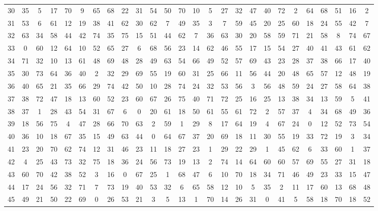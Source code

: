\begin{table}
\begin{tabular}{c c c c c c c c c c c c c c c c c c c c c c c c c c }
30 & 35 & 5 & 17 & 70 & 9 & 65 & 68 & 22 & 31 & 54 & 50 & 70 & 10 & 5 & 27 & 32 & 47 & 40 & 72 & 2 & 64 & 68 & 51 & 16 & 2 \\
31 & 53 & 6 & 61 & 12 & 19 & 38 & 41 & 62 & 30 & 62 & 7 & 49 & 35 & 3 & 7 & 59 & 45 & 20 & 25 & 60 & 18 & 24 & 55 & 42 & 7 \\
32 & 63 & 34 & 58 & 44 & 42 & 74 & 35 & 75 & 15 & 51 & 44 & 62 & 7 & 36 & 63 & 30 & 20 & 58 & 59 & 71 & 21 & 58 & 8 & 74 & 67 \\
33 & 0 & 60 & 12 & 64 & 10 & 52 & 65 & 27 & 6 & 68 & 56 & 23 & 14 & 62 & 46 & 55 & 17 & 15 & 54 & 27 & 40 & 41 & 43 & 61 & 62 \\
34 & 71 & 32 & 10 & 13 & 61 & 48 & 69 & 48 & 28 & 49 & 63 & 54 & 66 & 49 & 52 & 57 & 69 & 43 & 23 & 28 & 37 & 38 & 66 & 17 & 40 \\
35 & 30 & 73 & 64 & 36 & 40 & 2 & 32 & 29 & 69 & 55 & 19 & 60 & 31 & 25 & 66 & 11 & 56 & 44 & 20 & 48 & 65 & 57 & 12 & 48 & 19 \\
36 & 40 & 65 & 21 & 35 & 66 & 29 & 74 & 42 & 50 & 10 & 28 & 74 & 24 & 32 & 53 & 56 & 3 & 56 & 48 & 59 & 24 & 27 & 58 & 64 & 38 \\
37 & 38 & 72 & 47 & 18 & 13 & 60 & 52 & 23 & 60 & 67 & 26 & 75 & 40 & 71 & 72 & 25 & 16 & 25 & 13 & 38 & 34 & 13 & 59 & 5 & 41 \\
38 & 37 & 1 & 28 & 43 & 54 & 31 & 67 & 6 & 0 & 20 & 61 & 18 & 50 & 61 & 55 & 61 & 72 & 2 & 57 & 37 & 4 & 34 & 68 & 49 & 36 \\
39 & 18 & 56 & 75 & 4 & 47 & 28 & 66 & 70 & 63 & 2 & 59 & 1 & 29 & 8 & 17 & 64 & 19 & 4 & 67 & 24 & 0 & 12 & 52 & 73 & 54 \\
40 & 36 & 10 & 18 & 67 & 35 & 15 & 49 & 63 & 44 & 0 & 64 & 67 & 37 & 20 & 69 & 18 & 11 & 30 & 55 & 19 & 33 & 72 & 19 & 3 & 34 \\
41 & 23 & 20 & 70 & 62 & 74 & 12 & 31 & 46 & 23 & 11 & 18 & 27 & 23 & 1 & 29 & 22 & 29 & 1 & 45 & 62 & 6 & 33 & 60 & 1 & 37 \\
42 & 4 & 25 & 43 & 73 & 32 & 75 & 18 & 36 & 24 & 56 & 73 & 19 & 13 & 2 & 74 & 14 & 64 & 60 & 60 & 57 & 69 & 55 & 27 & 31 & 18 \\
43 & 60 & 70 & 42 & 38 & 52 & 3 & 16 & 0 & 67 & 25 & 1 & 68 & 47 & 6 & 10 & 70 & 18 & 34 & 71 & 46 & 49 & 23 & 33 & 15 & 47 \\
44 & 17 & 24 & 56 & 32 & 71 & 7 & 73 & 19 & 40 & 53 & 32 & 6 & 65 & 58 & 12 & 10 & 5 & 35 & 2 & 11 & 17 & 60 & 13 & 68 & 48 \\
45 & 49 & 21 & 50 & 22 & 69 & 0 & 26 & 53 & 21 & 3 & 5 & 13 & 1 & 70 & 14 & 26 & 31 & 0 & 41 & 5 & 58 & 18 & 70 & 18 & 52 \\

\end{tabular}
\end{table}
